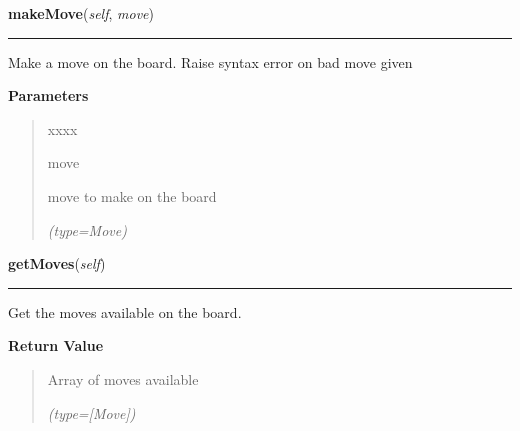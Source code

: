 \hspace{.8\funcindent}\begin{boxedminipage}{\funcwidth}

    \raggedright \textbf{makeMove}(\textit{self}, \textit{move})

    \vspace{-1.5ex}

    \rule{\textwidth}{0.5\fboxrule}
\setlength{\parskip}{2ex}
    Make a move on the board. Raise syntax error on bad move given

\setlength{\parskip}{1ex}
      \textbf{Parameters}
      \vspace{-1ex}

      \begin{quote}
        \begin{Ventry}{xxxx}

          \item[move]

          move to make on the board

            {\it (type=Move)}

        \end{Ventry}

      \end{quote}

    \end{boxedminipage}

    \label{UnBlockMeSolver:Map:Map:Map:getMoves}

    \vspace{0.5ex}

\hspace{.8\funcindent}\begin{boxedminipage}{\funcwidth}

    \raggedright \textbf{getMoves}(\textit{self})

    \vspace{-1.5ex}

    \rule{\textwidth}{0.5\fboxrule}
\setlength{\parskip}{2ex}
    Get the moves available on the board.

\setlength{\parskip}{1ex}
      \textbf{Return Value}
    \vspace{-1ex}

      \begin{quote}
      Array of moves available

      {\it (type=[Move])}

      \end{quote}

    \end{boxedminipage}

